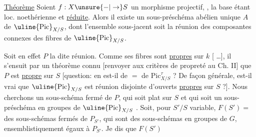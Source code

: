 \uline{Théorème}
Soient $f:X\unsure{-|\to}S$ un morphisme
projectif, ,  la base étant loc.
noethérienne et \uline{réduite}.
Alors il existe un
sous-préschéma abélien unique $A$ de $\uline{\mathrm{Pic}}_{X/S}$,
dont l'ensemble sous-jacent soit la réunion
des composantes connexes des fibres de $\uline{\mathrm{Pic}}_{X/S}$.

Soit en effet $P$ la dite réunion. Comme
ses fibres sont \uline{propres} sur $k$ [ \ldots],
il s'ensuit  par un théorème connu
[renvoyer aux critères de propreté au Ch. II]
que $P$ est \uline{propre} sur $S$ [question:
en est-il de $=$ de $\mathrm{Pic}^{\tau}_{X/S}$ ? De façon
générale, est-il vrai que $\uline{\mathrm{Pic}}_{X/S}$ est
réunion disjointe d'ouverts \uline{propres} sur
$S$ ?]. Nous cherchons un sous-schéma
fermé de $P$, qui soit plat sur $S$ et
qui soit un sous-préschéma en groupes
de $\uline{\mathrm{Pic}}_{X/S}$ .  Soit, pour $S'/S$
variable, $F(S')=$  des sous-schémas
fermés de $P_{S'}$, qui sont des sous-schémas
en groupes de $G$,  ensemblistiquement
égaux à $P_{S'}$. Je dis que  $F(S')$
